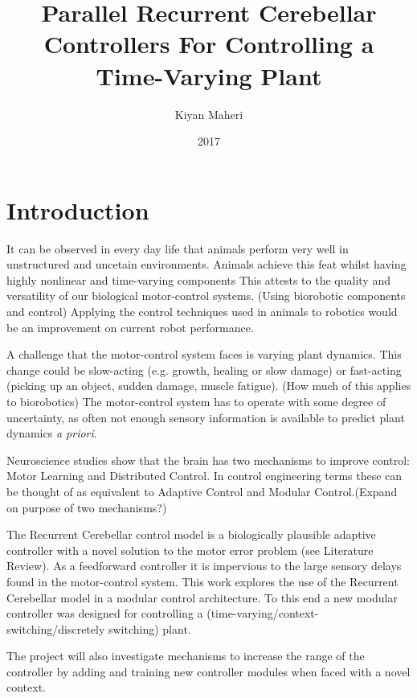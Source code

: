 \documentclass[11pt,a4paper]{report}
\title{Parallel Recurrent Cerebellar Controllers For Controlling a Time-Varying Plant}
\author{Kiyan Maheri}
\date{2017}
\begin{document}
\begin{titlepage}
\maketitle
\end{titlepage}

\section{Introduction}
It can be observed in every day life that animals perform very well in unstructured and uncetain environments. Animals achieve this feat whilst having highly nonlinear and time-varying components This attests to the quality and versatility of our biological motor-control systems. (Using biorobotic components and control) Applying the control techniques used in animals to robotics would be an improvement on current robot performance.\par


A challenge that the motor-control system faces is varying plant dynamics. This change could be slow-acting (e.g. growth, healing or slow damage) or fast-acting (picking up an object, sudden damage, muscle fatigue). (How much of this applies to biorobotics) The motor-control system has to operate with some degree of uncertainty, as often not enough sensory information is available to predict plant dynamics \textit{a priori}.\par 


Neuroscience studies show that the brain has two mechanisms to improve control: Motor Learning and Distributed Control. In control engineering terms these can be thought of as equivalent to Adaptive Control and Modular Control.(Expand on purpose of two mechanisms?)\par 

The Recurrent Cerebellar control model is a biologically plausible adaptive controller with a novel solution to the motor error problem (see Literature Review). As a feedforward controller it is impervious to the large sensory delays found in the motor-control system. This work explores the use of the Recurrent Cerebellar model in a modular control architecture. To this end a new modular controller was designed for controlling a (time-varying/context-switching/discretely switching) plant. \par


The project will also investigate mechanisms to increase the range of the controller by adding
and training new controller modules when faced with a novel context.\par
\end{document}
